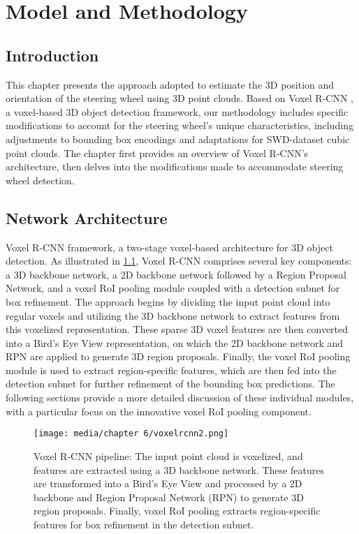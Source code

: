 \chapter{Model and Methodology}
\section{Introduction}
This chapter presents the approach adopted to estimate the 3D position and orientation of the steering wheel using 3D point clouds. Based on Voxel R-CNN \cite{voxelrcnn}, a voxel-based 3D object detection framework, our methodology includes specific modifications to account for the steering wheel’s unique characteristics, including adjustments to bounding box encodings and adaptations for SWD-dataset cubic point clouds. The chapter first provides an overview of Voxel R-CNN’s architecture, then delves into the modifications made to accommodate steering wheel detection.


\section{Network Architecture}
Voxel R-CNN framework, a two-stage voxel-based architecture for 3D object detection. As illustrated in \cref{fig:voxelrcnn}, Voxel R-CNN comprises several key components: a 3D backbone network, a 2D backbone network followed by a Region Proposal Network, and a voxel RoI pooling module coupled with a detection subnet for box refinement. The approach begins by dividing the input point cloud into regular voxels and utilizing the 3D backbone network to extract features from this voxelized representation. These sparse 3D voxel features are then converted into a Bird's Eye View representation, on which the 2D backbone network and RPN are applied to generate 3D region proposals. Finally, the voxel RoI pooling module is used to extract region-specific features, which are then fed into the detection subnet for further refinement of the bounding box predictions. The following sections provide a more detailed discussion of these individual modules, with a particular focus on the innovative voxel RoI pooling component.

\begin{figure}[htpb]
    \centering
    \texttt{[image: media/chapter 6/voxelrcnn2.png]}
    \caption{Voxel R-CNN pipeline: The input point cloud is voxelized, and features are extracted using a 3D backbone network. These features are transformed into a Bird’s Eye View and processed by a 2D backbone and Region Proposal Network (RPN) to generate 3D region proposals. Finally, voxel RoI pooling extracts region-specific features for box refinement in the detection subnet.}
    \label{fig:voxelrcnn}
\end{figure}

